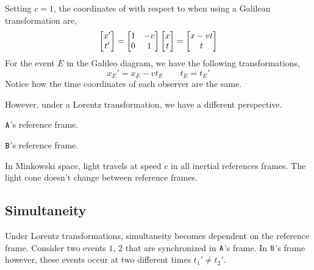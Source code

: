 \documentclass{article}
\begin{document}
Setting $c = 1$, the coordinates of  with respect to  when using a Galilean transformation are,
\[ \begin{bmatrix}x' \\ t'\end{bmatrix} = \begin{bmatrix}1 & - v \\ 0 & 1\end{bmatrix} \begin{bmatrix}x \\ t\end{bmatrix} = \begin{bmatrix}x - v t \\ t\end{bmatrix} \]
For the event $E$ in the Galileo diagram, we have the following transformations,
\[ x_E' = x_E - v t_E \qquad t_E = t_E' \]
Notice how the time coordinates of each observer are the same.

However, under a Lorentz transformation, we have a different perspective.

\begin{center}
  \begin{minipage}[b]{0.45\textwidth}
    \begin{center}
    $\texttt{A}$'s reference frame.
    \end{center}
  \end{minipage}
  \begin{minipage}[b]{0.45\textwidth}
    \begin{center}
    $\texttt{B}$'s reference frame.
    \end{center}
  \end{minipage}
\end{center}

In Minkowski space, light travels at speed $c$ in all inertial references frames. The light cone doesn't change between reference frames.

\subsection{Simultaneity}

Under Lorentz transformations, simultaneity becomes dependent on the reference frame. Consider two events $1$, $2$ that are synchronized in $\texttt{A}$'s frame. In $\texttt{B}$'s frame however, these events occur at two different times $t_1' \neq t_2'$. \\
\end{document}
